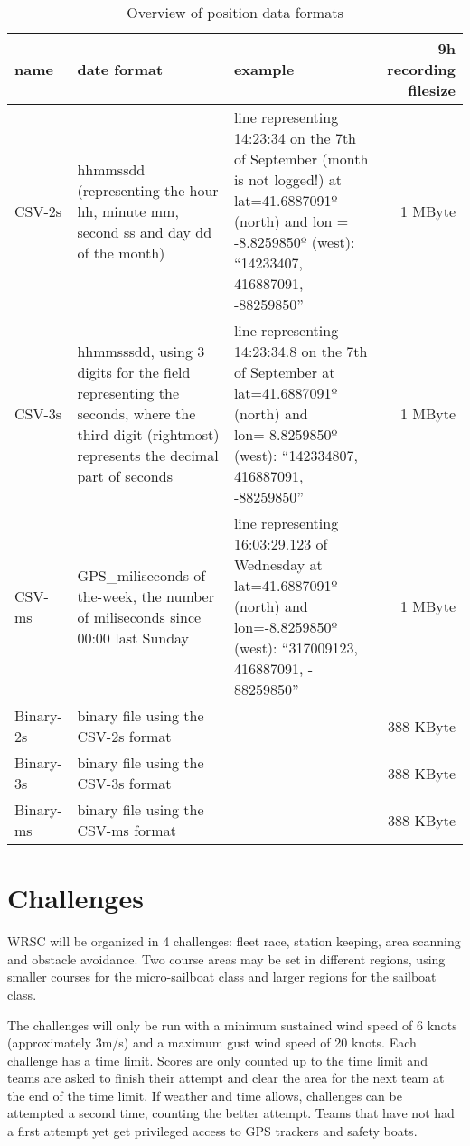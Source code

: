 \documentclass[12pt]{article}
\begin{document}
\begin{landscape}
\centering
\begin{table}
\caption{Overview of position data formats}
\label{tab:dataformats}
\small{
\begin{tabular}{l|p{6cm}|p{8cm}|r}
name   & date format & example & 9h recording filesize\\
\hline
CSV-2s & hhmmssdd (representing
the hour hh, minute mm, second ss and day dd of the month) &
line representing 14:23:34 on the 7th of September (month is not logged!) at lat=41.6887091º (north) and lon = -8.8259850º (west):
``14233407, 416887091, -88259850'' &
1 MByte\\ \hline

CSV-3s & hhmmsssdd, using 3 digits for the field representing the
seconds, where the third digit (rightmost) represents the decimal part of
seconds & line representing 14:23:34.8 on the 7th of September at
lat=41.6887091º (north) and lon=-8.8259850º (west):
``142334807, 416887091, -88259850''&
1 MByte \\ \hline

CSV-ms & GPS\_miliseconds-of-the-week, the number of miliseconds since 00:00 last Sunday &
line representing 16:03:29.123 of Wednesday at
lat=41.6887091º (north) and lon=-8.8259850º (west):
 “317009123, 416887091, - 88259850”&
1 MByte\\ \hline

Binary-2s &
binary file using the CSV-2s format&
&
388 KByte \\ \hline

Binary-3s &
binary file using the CSV-3s format&
&
388 KByte\\ \hline

Binary-ms &
binary file using the CSV-ms format &
&
388 KByte\\ \hline
\end{tabular}
}
\end{table}
\end{landscape}



\section{Challenges}
WRSC will be organized in 4 challenges: fleet race, station keeping, area
scanning and obstacle avoidance.
Two course areas may be set in different regions, using smaller courses for the
micro-sailboat class and larger regions for the sailboat class. 

The challenges will only be run with a minimum sustained wind speed of 6 knots
(approximately 3m/s) and a maximum gust wind speed of 20 knots.
Each challenge has a time limit. Scores are only counted up to the time limit 
and teams are asked to finish their attempt and clear the area for the next team 
at the end of the time limit. 
If weather and time allows, challenges can be attempted a
second time, counting the better attempt. Teams that have not had a
first attempt yet get privileged access to GPS trackers and safety boats.
\end{document}

